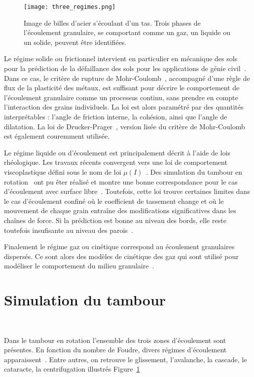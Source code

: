 \begin{figure}
    \texttt{[image: three\_regimes.png]}
    \caption{Image de billes d'acier s'écoulant d'un tas. Trois phases de l'écoulement granulaire, se comportant comme un gaz, un liquide ou un solide, peuvent être identifiées.~\cite{forterre_flows_2008}}
\end{figure}

Le régime solide ou frictionnel intervient en particulier en mécanique des sols pour la prédiction de la défaillance des sols pour les applications de génie civil~\cite{Campbell2006}. Dans ce cas, le critère de rupture de Mohr-Coulomb~\cite{Juvinal1991}, accompagné d'une règle de flux de la plasticité des métaux, est suffisant pour décrire le comportement de l'écoulement granulaire comme un processus continu, sans prendre en compte l'interaction des grains individuels. La loi est alors paramétré par des quantités interprétables : l'angle de friction interne, la cohésion, ainsi que l'angle de dilatation. La loi de Drucker-Prager~\cite{Drucker1952}, version lisée du critère de Mohr-Coulomb est également couremment utilisée.


Le régime liquide ou d'écoulement est principalement décrit à l'aide de lois rhéologique. Les travaux récents convergent vers une loi de comportement viscoplastique défini sous le nom de loi $\mu(I)$~\cite{gdr_midi_dense_2004,jop_constitutive_2006}. Des simulation du tambour en rotation~\cite{Cortet_2009} ont pu êter réalisé et montre une bonne correspondance pour le cas d'écoulement avec surface libre~\cite{chou_cross-sectional_2009}. Toutefois, cette loi trouve certaines limites dans le cas d'écoulement confiné où le coefficient de tassement change et où le mouvement de chaque grain entraîne des modifications significatives dans les chaînes de force. Si la prédiction est bonne au niveau des bords, elle reste toutefois insufisante au niveau des parois~\cite{Rognon_Miller_Metzger_Einav_2015}.

Finalement le régime gaz ou cinétique correspond au écoulement granulaires dispersés. Ce sont alors des modèles de cinétique des gaz qui sont utilisé pour modéliser le comportement du milieu granulaire~\cite{Ng2008}.


\section{Simulation du tambour}~\label{sec:simu_broyeur}

Dans le tambour en rotation l'ensemble des trois zones d'écoulement sont présentes. En fonction du nombre de Foudre, divers régimes d'écoulement apparaissent~\cite{MELLMANN2001251}. Entre autres, on retrouve le glissement, l'avalanche, la cascade, le cataracte, la centrifugation illustrés Figure~\ref{}

